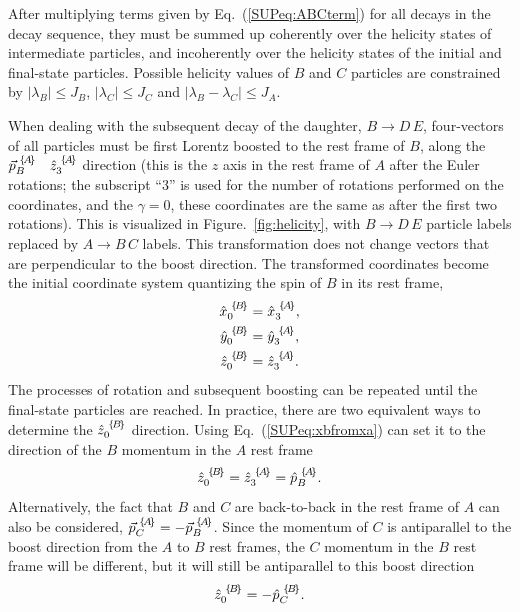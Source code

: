 After multiplying terms given by Eq.~(\ref{SUPeq:ABCterm}) for all decays in the decay sequence, 
they must be summed up coherently over the helicity states of intermediate particles, 
and incoherently over the helicity states of the initial and final-state particles. 
Possible helicity values of $B$ and $C$ particles are constrained by 
$|\lambda_B|\le J_B$, $|\lambda_C|\le J_C$ and $|\lambda_B-\lambda_C|\le J_A$.

When dealing with the subsequent decay of the daughter, $B\to D\, E$,
four-vectors of all particles must be first Lorentz boosted to the rest frame of $B$, 
along the ${\vec{p}}_{{B}}^{\,\,\{\!A\!\}}$ \ie\ ${\hat{z}}_{{3}}^{\,\,\{\!A\!\}}$ direction 
(this is the $z$ axis in the rest frame of $A$ after the Euler rotations; 
the subscript ``3'' is used for the number of rotations performed on the coordinates, 
and the $\gamma=0$,
these coordinates are the same as after the first two rotations).
This is visualized in Figure.~\ref{fig:helicity},
with $B\to D\, E$ particle labels replaced by $A\to B\, C$ labels.
This transformation does not change vectors that are perpendicular to the boost direction.
The transformed coordinates become the initial coordinate system quantizing the spin of $B$ in its
rest frame,
\begin{align}
\BA{\hat{x}}{0}{B} & =\BA{\hat{x}}{3}{A}, \notag\\
\BA{\hat{y}}{0}{B} & =\BA{\hat{y}}{3}{A}, \notag\\
\BA{\hat{z}}{0}{B} & =\BA{\hat{z}}{3}{A}.
\label{SUPeq:xbfromxa}
\end{align}
The processes of rotation and subsequent boosting can be repeated until the final-state particles are reached.
In practice, 
there are two equivalent ways to determine the ${\hat{z}}_{{0}}^{\,\,\{\!B\!\}}$ direction.
Using Eq.~(\ref{SUPeq:xbfromxa}) can set it to the direction of the $B$ momentum in the $A$ rest frame
\begin{equation}
{\hat{z}}_{{0}}^{\,\,\{\!B\!\}} ={\hat{z}}_{{3}}^{\,\,\{\!A\!\}} = {\hat{p}}_{{B}}^{\,\,\{\!A\!\}}.
\label{SUPeq:zboost}
\end{equation}
Alternatively, the fact that $B$ and $C$ are back-to-back in the rest frame of $A$ can also be considered, 
${\vec{p}}_{{C}}^{\,\,\{\!A\!\}}= - {\vec{p}}_{{B}}^{\,\,\{\!A\!\}}$.
Since the momentum of $C$ is antiparallel to the boost direction from the $A$ to $B$ rest frames,
the $C$ momentum in the $B$ rest frame will be different, but it will still be antiparallel to this boost direction
\begin{equation}
{\hat{z}}_{{0}}^{\,\,\{\!B\!\}} = - {\hat{p}}_{{C}}^{\,\,\{\!B\!\}}.
\label{SUPeq:zrecoil}
\end{equation}
